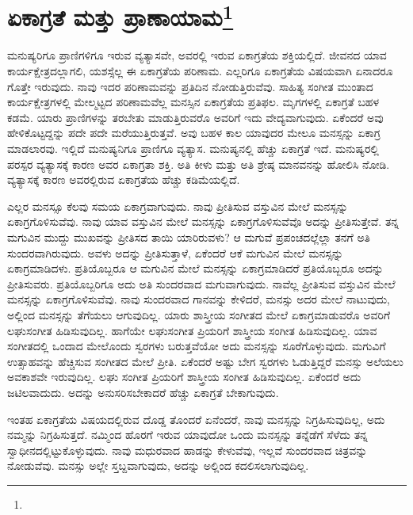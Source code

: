 
\chapter[ಏಕಾಗ್ರತೆ ಮತ್ತು ಪ್ರಾಣಾಯಾಮ]{ಏಕಾಗ್ರತೆ ಮತ್ತು ಪ್ರಾಣಾಯಾಮ\protect\footnote{}}

ಮನುಷ್ಯರಿಗೂ ಪ್ರಾಣಿಗಳಿಗೂ ಇರುವ ವ್ಯತ್ಯಾಸವೇ, ಅವರಲ್ಲಿ ಇರುವ ಏಕಾಗ್ರತೆಯ ಶಕ್ತಿಯಲ್ಲಿದೆ. ಜೀವನದ ಯಾವ ಕಾರ್ಯಕ್ಷೇತ್ರದಲ್ಲಾಗಲಿ, ಯಶಸ್ಸೆಲ್ಲ ಈ ಏಕಾಗ್ರತೆಯ ಪರಿಣಾಮ. ಎಲ್ಲರಿಗೂ ಏಕಾಗ್ರತೆಯ ವಿಷಯವಾಗಿ ಏನಾದರೂ ಗೊತ್ತೇ ಇರುವುದು. ನಾವು ಇದರ ಪರಿಣಾಮವನ್ನು ಪ್ರತಿದಿನ ನೋಡುತ್ತಿರುವೆವು. ಸಾಹಿತ್ಯ ಸಂಗೀತ ಮುಂತಾದ ಕಾರ್ಯಕ್ಷೇತ್ರಗಳಲ್ಲಿ ಮೇಲ್ಮಟ್ಟದ ಪರಿಣಾಮವೆಲ್ಲ ಮನಸ್ಸಿನ ಏಕಾಗ್ರತೆಯ ಪ್ರತಿಫಲ. ಮೃಗಗಳಲ್ಲಿ ಏಕಾಗ್ರತೆ ಬಹಳ ಕಡಮೆ. ಯಾರು ಪ್ರಾಣಿಗಳನ್ನು ತರಬೇತು ಮಾಡುತ್ತಿರುವರೊ ಅವರಿಗೆ ಇದು ವೇದ್ಯವಾಗುವುದು. ಏಕೆಂದರೆ ಅವು ಹೇಳಿಕೊಟ್ಟದ್ದನ್ನು ಪದೇ ಪದೇ ಮರೆಯುತ್ತಿರುತ್ತವೆ. ಅವು ಬಹಳ ಕಾಲ ಯಾವುದರ ಮೇಲೂ ಮನಸ್ಸನ್ನು ಏಕಾಗ್ರ ಮಾಡಲಾರವು. ಇಲ್ಲಿದೆ ಮನುಷ್ಯನಿಗೂ ಪ್ರಾಣಿಗೂ ವ್ಯತ್ಯಾಸ. ಮನುಷ್ಯನಲ್ಲಿ ಹೆಚ್ಚು ಏಕಾಗ್ರತೆ ಇದೆ. ಮನುಷ್ಯರಲ್ಲಿ ಪರಸ್ಪರ ವ್ಯತ್ಯಾಸಕ್ಕೆ ಕಾರಣ ಅವರ ಏಕಾಗ್ರತಾ ಶಕ್ತಿ. ಅತಿ ಕೀಳು ಮತ್ತು ಅತಿ ಶ್ರೇಷ್ಠ ಮಾನವನನ್ನು ಹೋಲಿಸಿ ನೋಡಿ. ವ್ಯತ್ಯಾಸಕ್ಕೆ ಕಾರಣ ಅವರಲ್ಲಿರುವ ಏಕಾಗ್ರತೆಯ ಹೆಚ್ಚು ಕಡಿಮೆಯಲ್ಲಿದೆ.

ಎಲ್ಲರ ಮನಸ್ಸೂ ಕೆಲವು ಸಮಯ ಏಕಾಗ್ರವಾಗುವುದು. ನಾವು ಪ್ರೀತಿಸುವ ವಸ್ತುವಿನ ಮೇಲೆ ಮನಸ್ಸನ್ನು ಏಕಾಗ್ರಗೊಳಿಸುವೆವು. ನಾವು ಯಾವ ವಸ್ತುವಿನ ಮೇಲೆ ಮನಸ್ಸನ್ನು ಏಕಾಗ್ರಗೊಳಿಸುವೆವೊ ಅದನ್ನು ಪ್ರೀತಿಸುತ್ತೇವೆ. ತನ್ನ ಮಗುವಿನ ಮುದ್ದು ಮುಖವನ್ನು ಪ್ರೀತಿಸದ ತಾಯಿ ಯಾರಿರುವಳು? ಆ ಮಗುವೆ ಪ್ರಪಂಚದಲ್ಲೆಲ್ಲಾ ತನಗೆ ಅತಿ ಸುಂದರವಾಗಿರುವುದು. ಅವಳು ಅದನ್ನು ಪ್ರೀತಿಸುತ್ತಾಳೆ, ಏಕೆಂದರೆ ಆಕೆ ಮಗುವಿನ ಮೇಲೆ ಮನಸ್ಸನ್ನು ಏಕಾಗ್ರಮಾಡಿದಳು. ಪ್ರತಿಯೊಬ್ಬರೂ ಆ ಮಗುವಿನ ಮೇಲೆ ಮನಸ್ಸನ್ನು ಏಕಾಗ್ರಮಾಡಿದರೆ ಪ್ರತಿಯೊಬ್ಬರೂ ಅದನ್ನು ಪ್ರೀತಿಸುವರು. ಪ್ರತಿಯೊಬ್ಬರಿಗೂ ಅದು ಅತಿ ಸುಂದರವಾದ ಮಗುವಾಗುವುದು. ನಾವೆಲ್ಲ ಪ್ರೀತಿಸುವ ವಸ್ತುವಿನ ಮೇಲೆ ಮನಸ್ಸನ್ನು ಏಕಾಗ್ರಗೊಳಿಸುವೆವು. ನಾವು ಸುಂದರವಾದ ಗಾನವನ್ನು ಕೇಳಿದರೆ, ಮನಸ್ಸು ಅದರ ಮೇಲೆ ನಾಟುವುದು, ಅಲ್ಲಿಂದ ಮನಸ್ಸನ್ನು ತೆಗೆಯಲು ಆಗುವುದಿಲ್ಲ. ಯಾರು ಶಾಸ್ತ್ರೀಯ ಸಂಗೀತದ ಮೇಲೆ ಏಕಾಗ್ರಮಾಡುವರೊ ಅವರಿಗೆ ಲಘುಸಂಗೀತ ಹಿಡಿಸುವುದಿಲ್ಲ. ಹಾಗೆಯೇ ಲಘುಸಂಗೀತ ಪ್ರಿಯರಿಗೆ ಶಾಸ್ತ್ರೀಯ ಸಂಗೀತ ಹಿಡಿಸುವುದಿಲ್ಲ. ಯಾವ ಸಂಗೀತದಲ್ಲಿ ಒಂದಾದ ಮೇಲೊಂದು ಸ್ವರಗಳು ಬರುತ್ತವೆಯೋ ಅದು ಮನಸ್ಸನ್ನು ಸೂರೆಗೊಳ್ಳುವುದು. ಮಗುವಿಗೆ ಉತ್ಸಾಹವನ್ನು ಹೆಚ್ಚಿಸುವ ಸಂಗೀತದ ಮೇಲೆ ಪ್ರೀತಿ. ಏಕೆಂದರೆ ಅಷ್ಟು ಬೇಗ ಸ್ವರಗಳು ಓಡುತ್ತಿದ್ದರೆ ಮನಸ್ಸು ಅಲೆಯಲು ಅವಕಾಶವೇ ಇರುವುದಿಲ್ಲ. ಲಘು ಸಂಗೀತ ಪ್ರಿಯರಿಗೆ ಶಾಸ್ತ್ರೀಯ ಸಂಗೀತ ಹಿಡಿಸುವುದಿಲ್ಲ. ಏಕೆಂದರೆ ಅದು ಜಟಿಲವಾದುದು. ಅದನ್ನು ಅನುಸರಿಸಬೇಕಾದರೆ ಹೆಚ್ಚು ಏಕಾಗ್ರತೆ ಬೇಕಾಗುವುದು.

ಇಂತಹ ಏಕಾಗ್ರತೆಯ ವಿಷಯದಲ್ಲಿರುವ ದೊಡ್ಡ ತೊಂದರೆ ಏನೆಂದರೆ, ನಾವು ಮನಸ್ಸನ್ನು ನಿಗ್ರಹಿಸುವುದಿಲ್ಲ, ಅದು ನಮ್ಮನ್ನು ನಿಗ್ರಹಿಸುತ್ತದೆ. ನಮ್ಮಿಂದ ಹೊರಗೆ ಇರುವ ಯಾವುದೋ ಒಂದು ಮನಸ್ಸನ್ನು ತನ್ನೆಡೆಗೆ ಸೆಳೆದು ತನ್ನ ಸ್ವಾಧೀನದಲ್ಲಿಟ್ಟುಕೊಳ್ಳುವುದು. ನಾವು ಮಧುರವಾದ ಹಾಡನ್ನು ಕೇಳುವೆವು, ಇಲ್ಲವೆ ಸುಂದರವಾದ ಚಿತ್ರವನ್ನು ನೋಡುವೆವು. ಮನಸ್ಸು ಅಲ್ಲೇ ಸ್ತಬ್ದವಾಗುವುದು, ಅದನ್ನು ಅಲ್ಲಿಂದ ಕದಲಿಸಲಾಗುವುದಿಲ್ಲ.


